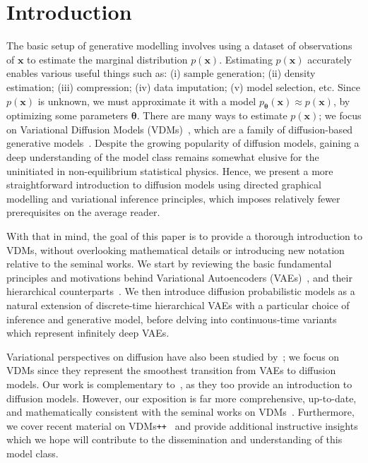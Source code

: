 \section{Introduction}
\label{sec: introduction}
%
The basic setup of generative modelling involves using a dataset of observations of $\mathbf{x}$ to estimate the marginal distribution $p(\mathbf{x})$. Estimating $p(\mathbf{x})$ accurately enables various useful things such as: (i) sample generation; (ii) density estimation; (iii) compression; (iv) data imputation; (v) model selection, etc. Since $p(\mathbf{x})$ is unknown, we must approximate it with a model $p_{\boldsymbol{\theta}}(\mathbf{x}) \approx p(\mathbf{x})$, by optimizing some parameters $\boldsymbol{\theta}$. There are many ways to estimate $p(\mathbf{x})$; we focus on Variational Diffusion Models (VDMs)~\citep{kingma2021variational,kingma2023understanding}, which are a family of diffusion-based generative models~\citep{sohl2015deep}. Despite the growing popularity of diffusion models, gaining a deep understanding of the model class remains somewhat elusive for the uninitiated in non-equilibrium statistical physics. Hence, we present a more straightforward introduction to diffusion models using directed graphical modelling and variational inference principles, which imposes relatively fewer prerequisites on the average reader.

With that in mind, the goal of this paper is to provide a thorough introduction to VDMs, without overlooking mathematical details or introducing new notation relative to the seminal works. We start by reviewing the basic fundamental principles and motivations behind Variational Autoencoders (VAEs)~\citep{kingma2013auto,rezende2014stochastic}, and their hierarchical counterparts~\citep{salimans2015markov,sonderby2016ladder,kingma2016improved}. We then introduce diffusion probabilistic models as a natural extension of discrete-time hierarchical VAEs with a particular choice of inference and generative model, before delving into continuous-time variants which represent infinitely deep VAEs.

Variational perspectives on diffusion have also been studied by~\cite{tzen2019neural,huang2021variational,vahdat2021score}; we focus on VDMs since they represent the smoothest transition from VAEs to diffusion models. Our work is complementary to~\cite{luo2022understanding}, as they too provide an introduction to diffusion models. However, our exposition is far more comprehensive, up-to-date, and mathematically consistent with the seminal works on VDMs~\citep{kingma2021variational,kingma2023understanding}. Furthermore, we cover recent material on VDMs\texttt{++}~\citep{kingma2023understanding} and provide additional instructive insights which we hope will contribute to the dissemination and understanding of this model class.
%
